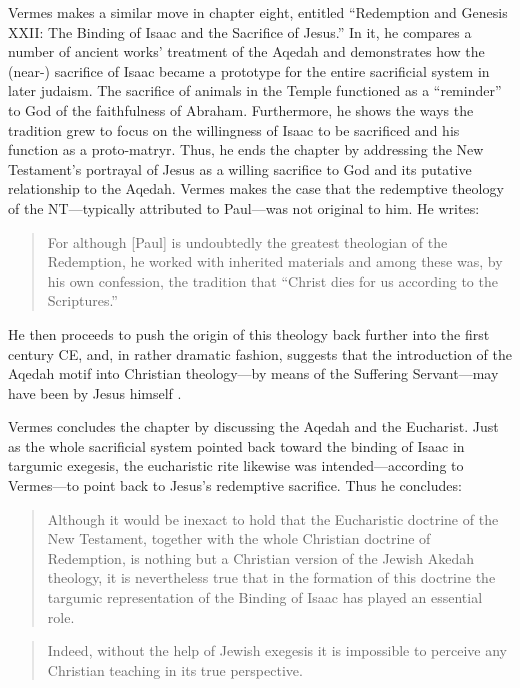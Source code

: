 Vermes makes a similar move in chapter eight, entitled ``Redemption and
Genesis XXII: The Binding of Isaac and the Sacrifice of Jesus.'' In it,
he compares a number of ancient works' treatment of the Aqedah and
demonstrates how the (near-) sacrifice of Isaac became a prototype for
the entire sacrificial system in later judaism. The sacrifice of animals
in the Temple functioned as a ``reminder'' to God of the faithfulness of
Abraham. Furthermore, he shows the ways the tradition grew to focus on
the willingness of Isaac to be sacrificed and his function as a
proto-matryr. Thus, he ends the chapter by addressing the New
Testament's portrayal of Jesus as a willing sacrifice to God and its
putative relationship to the Aqedah. Vermes makes the case that the
redemptive theology of the NT---typically attributed to Paul---was not
original to him. He writes:

\begin{quote}
For although {[}Paul{]} is undoubtedly the greatest theologian of the
Redemption, he worked with inherited materials and among these was, by
his own confession, the tradition that ``Christ dies for us according to
the Scriptures.''\autocite[221]{vermes1961}
\end{quote}

He then proceeds to push the origin of this theology back further into
the first century CE, and, in rather dramatic fashion, suggests that the
introduction of the Aqedah motif into Christian theology---by means of
the Suffering Servant---may have been by Jesus himself
\autocite[223]{vermes1961}.

Vermes concludes the chapter by discussing the Aqedah and the Eucharist.
Just as the whole sacrificial system pointed back toward the binding of
Isaac in targumic exegesis, the eucharistic rite likewise was
intended---according to Vermes---to point back to Jesus's redemptive
sacrifice. Thus he concludes:

\begin{quote}
Although it would be inexact to hold that the Eucharistic doctrine of
the New Testament, together with the whole Christian doctrine of
Redemption, is nothing but a Christian version of the Jewish Akedah
theology, it is nevertheless true that in the formation of this doctrine
the targumic representation of the Binding of Isaac has played an
essential role.
\end{quote}

\begin{quote}
Indeed, without the help of Jewish exegesis it is impossible to perceive
any Christian teaching in its true
perspective.\autocite[227]{vermes1961}
\end{quote}

